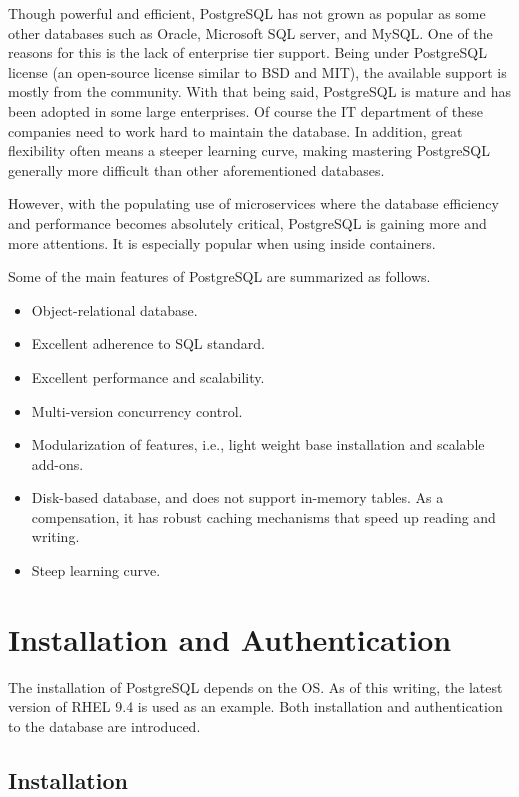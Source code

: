 Though powerful and efficient, PostgreSQL has not grown as popular as some other databases such as Oracle, Microsoft SQL server, and MySQL. One of the reasons for this is the lack of enterprise tier support. Being under PostgreSQL license (an open-source license similar to BSD and MIT), the available support is mostly from the community. With that being said, PostgreSQL is mature and has been adopted in some large enterprises. Of course the IT department of these companies need to work hard to maintain the database. In addition, great flexibility often means a steeper learning curve, making mastering PostgreSQL generally more difficult than other aforementioned databases.

However, with the populating use of microservices where the database efficiency and performance becomes absolutely critical, PostgreSQL is gaining more and more attentions. It is especially popular when using inside containers.

Some of the main features of PostgreSQL are summarized as follows.
\begin{itemize}
	\item Object-relational database.
	\item Excellent adherence to SQL standard.
	\item Excellent performance and scalability.
	\item Multi-version concurrency control.
	\item Modularization of features, i.e., light weight base installation and scalable add-ons.
	\item Disk-based database, and does not support in-memory tables. As a compensation, it has robust caching mechanisms that speed up reading and writing.
	\item Steep learning curve.
\end{itemize}

\section{Installation and Authentication}

The installation of PostgreSQL depends on the OS. As of this writing, the latest version of RHEL 9.4 is used as an example. Both installation and authentication to the database are introduced.

\subsection{Installation}

